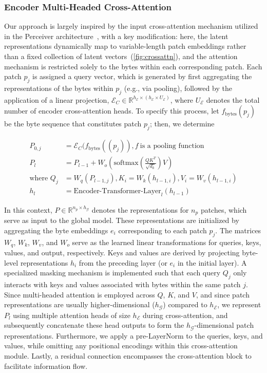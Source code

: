 \subsubsection{Encoder Multi-Headed Cross-Attention}
\label{sec:enc-cross-attn}
Our approach is largely inspired by the input cross-attention mechanism utilized in the Perceiver architecture~\citep{jaegle2021perceiver}, with a key modification: here, the latent representations dynamically map to variable-length patch embeddings rather than a fixed collection of latent vectors~(\autoref{fig:crossattn}), and the attention mechanism is restricted solely to the bytes within each corresponding patch. Each patch $p_j$ is assigned a query vector, which is generated by first aggregating the representations of the bytes within $p_j$ (e.g., via pooling), followed by the application of a linear projection, $\mathcal{E}_{C} \in \mathbb{R}^{h_{\mathcal{E}} \times (h_{\mathcal{E}} \times U_{\mathcal{E}})}$, where $U_{\mathcal{E}}$ denotes the total number of encoder cross-attention heads. To specify this process, let $f_{\text{bytes}}(p_j)$ be the byte sequence that constitutes patch $p_j$; then, we determine

\begin{align}
P_{0,j} &= \mathcal{E}_{C}(f_\text{bytes}((p_j)), f~ \text{is a pooling function} \\
P_l &= P_{l-1} + W_o\left(\text{softmax}\left(\frac{QK^T}{\sqrt{d_k}}\right)V\right) \\
\text{where } Q_j &= W_q(P_{l-1,j}), K_i = W_k(h_{l-1,i}), V_i = W_v(h_{l-1,i}) \\
h_l &= \text{Encoder-Transformer-Layer}_l(h_{l-1})
\end{align}

In this context, $P \in \mathbb{R}^{n_p \times h_{\mathcal{G}}}$ denotes the representations for $n_p$ patches, which serve as input to the global model. These representations are initialized by aggregating the byte embeddings $e_i$ corresponding to each patch $p_j$. The matrices $W_q$, $W_k$, $W_v$, and $W_o$ serve as the learned linear transformations for queries, keys, values, and output, respectively. Keys and values are derived by projecting byte-level representations $h_i$ from the preceding layer (or $e_i$ in the initial layer). A specialized masking mechanism is implemented such that each query $Q_j$ only interacts with keys and values associated with bytes within the same patch $j$. Since multi-headed attention is employed across $Q$, $K$, and $V$, and since patch representations are usually higher-dimensional ($h_{\mathcal{G}}$) compared to $h_{\mathcal{E}}$, we represent $P_l$ using multiple attention heads of size $h_{\mathcal{E}}$ during cross-attention, and subsequently concatenate these head outputs to form the $h_{\mathcal{G}}$-dimensional patch representations. Furthermore, we apply a pre-LayerNorm to the queries, keys, and values, while omitting any positional encodings within this cross-attention module. Lastly, a residual connection encompasses the cross-attention block to facilitate information flow.

